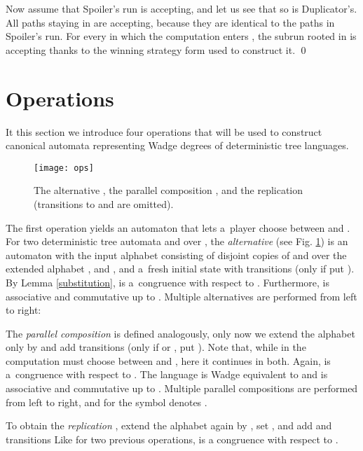 \documentclass{LMCS}
\begin{document}
Now assume that Spoiler's run is accepting, and let us see that so is Duplicator's. All paths staying in  are accepting, because they are identical to the paths in Spoiler's run. For every  in which the computation enters , the subrun rooted in  is accepting thanks to the winning strategy form  used to construct it. \qed

\section{Operations} \label{operations}

It this section we introduce four operations that will be used to
construct canonical automata representing Wadge degrees of
deterministic tree languages.

\begin{figure}
\centering
\texttt{[image: ops]}
\caption{The alternative , the parallel composition , and the replication  (transitions to  and  are omitted).}
\label{fig:alternative}
\end{figure}

The first operation yields an automaton that lets a~player choose between  and . For two deterministic tree automata  and  over , the {\em alternative}   (see Fig. \ref{fig:alternative}) is an automaton with the input alphabet  consisting of disjoint copies of  and  over the extended alphabet ,  and , and a~fresh initial state  with transitions  (only if  put ). By Lemma \ref{substitution},  is a~congruence with respect to . Furthermore,  is associative and commutative up to .  Multiple alternatives are performed from left to right:  

The {\em parallel composition}   is defined analogously, only now we extend the alphabet only by  and add transitions  (only if  or , put ).  Note that, while in  the computation must choose between  and , here it continues in both. Again,  is a~congruence with respect to . The language  is Wadge equivalent to  and  is associative and commutative up to . Multiple parallel compositions are performed from left to right, and for  the symbol  denotes .\label{automatapower}

To obtain the {\em  replication} , extend the alphabet again by
, set , and add and transitions 
 Like for two previous operations,  is a congruence with respect to .
\end{document}
